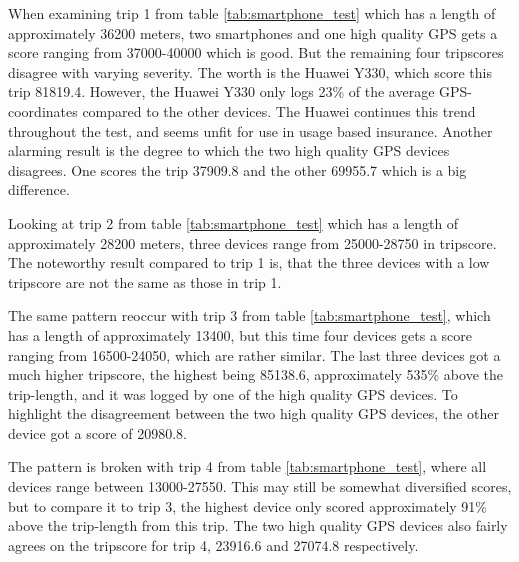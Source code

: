 When examining trip 1 from table \ref{tab:smartphone_test} which has a length of approximately 36200 meters, two smartphones and one high quality GPS gets a score ranging from 37000-40000 which is good. But the remaining four tripscores disagree with varying severity. The worth is the Huawei Y330, which score this trip 81819.4. However, the Huawei Y330 only logs 23\% of the average GPS-coordinates compared to the other devices. The Huawei continues this trend throughout the test, and seems unfit for use in usage based insurance. Another alarming result is the degree to which the two high quality GPS devices disagrees. One scores the trip 37909.8 and the other 69955.7 which is a big difference.

Looking at trip 2 from table \ref{tab:smartphone_test} which has a length of approximately 28200 meters, three devices range from 25000-28750 in tripscore. The noteworthy result compared to trip 1 is, that the three devices with a low tripscore are not the same as those in trip 1.

The same pattern reoccur with trip 3 from table \ref{tab:smartphone_test}, which has a length of approximately 13400, but this time four devices gets a score ranging from 16500-24050, which are rather similar. The last three devices got a much higher tripscore, the highest being 85138.6, approximately 535\% above the trip-length, and it was logged by one of the high quality GPS devices. To highlight the disagreement between the two high quality GPS devices, the other device got a score of 20980.8. 

The pattern is broken with trip 4 from table \ref{tab:smartphone_test}, where all devices range between 13000-27550. This may still be somewhat diversified scores, but to compare it to trip 3, the highest device only scored approximately 91\% above the trip-length from this trip. The two high quality GPS devices also fairly agrees on the tripscore for trip 4, 23916.6 and 27074.8 respectively. 

